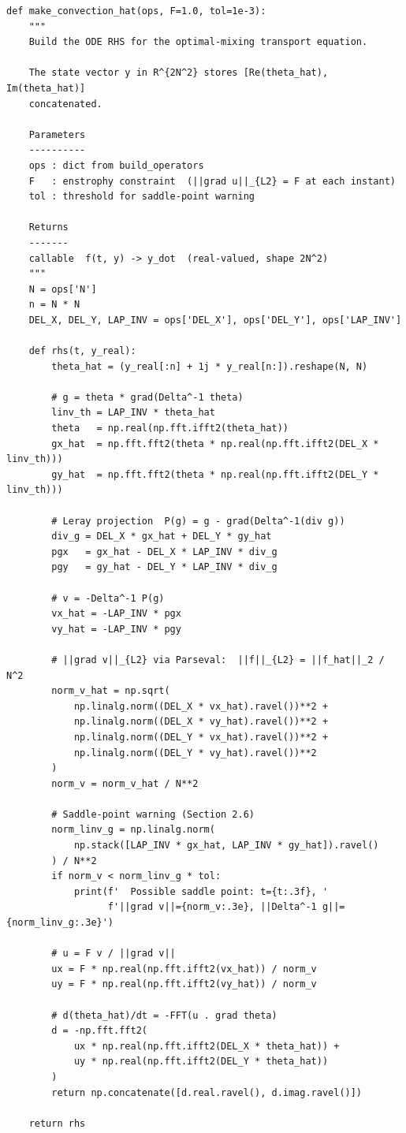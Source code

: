 \documentclass[12pt,a4paper]{article}
\theoremstyle{definition}
\theoremstyle{plain}
\begin{document}
\begin{lstlisting}
def make_convection_hat(ops, F=1.0, tol=1e-3):
    """
    Build the ODE RHS for the optimal-mixing transport equation.

    The state vector y in R^{2N^2} stores [Re(theta_hat), Im(theta_hat)]
    concatenated.

    Parameters
    ----------
    ops : dict from build_operators
    F   : enstrophy constraint  (||grad u||_{L2} = F at each instant)
    tol : threshold for saddle-point warning

    Returns
    -------
    callable  f(t, y) -> y_dot  (real-valued, shape 2N^2)
    """
    N = ops['N']
    n = N * N
    DEL_X, DEL_Y, LAP_INV = ops['DEL_X'], ops['DEL_Y'], ops['LAP_INV']

    def rhs(t, y_real):
        theta_hat = (y_real[:n] + 1j * y_real[n:]).reshape(N, N)

        # g = theta * grad(Delta^-1 theta)
        linv_th = LAP_INV * theta_hat
        theta   = np.real(np.fft.ifft2(theta_hat))
        gx_hat  = np.fft.fft2(theta * np.real(np.fft.ifft2(DEL_X * linv_th)))
        gy_hat  = np.fft.fft2(theta * np.real(np.fft.ifft2(DEL_Y * linv_th)))

        # Leray projection  P(g) = g - grad(Delta^-1(div g))
        div_g = DEL_X * gx_hat + DEL_Y * gy_hat
        pgx   = gx_hat - DEL_X * LAP_INV * div_g
        pgy   = gy_hat - DEL_Y * LAP_INV * div_g

        # v = -Delta^-1 P(g)
        vx_hat = -LAP_INV * pgx
        vy_hat = -LAP_INV * pgy

        # ||grad v||_{L2} via Parseval:  ||f||_{L2} = ||f_hat||_2 / N^2
        norm_v_hat = np.sqrt(
            np.linalg.norm((DEL_X * vx_hat).ravel())**2 +
            np.linalg.norm((DEL_X * vy_hat).ravel())**2 +
            np.linalg.norm((DEL_Y * vx_hat).ravel())**2 +
            np.linalg.norm((DEL_Y * vy_hat).ravel())**2
        )
        norm_v = norm_v_hat / N**2

        # Saddle-point warning (Section 2.6)
        norm_linv_g = np.linalg.norm(
            np.stack([LAP_INV * gx_hat, LAP_INV * gy_hat]).ravel()
        ) / N**2
        if norm_v < norm_linv_g * tol:
            print(f'  Possible saddle point: t={t:.3f}, '
                  f'||grad v||={norm_v:.3e}, ||Delta^-1 g||={norm_linv_g:.3e}')

        # u = F v / ||grad v||
        ux = F * np.real(np.fft.ifft2(vx_hat)) / norm_v
        uy = F * np.real(np.fft.ifft2(vy_hat)) / norm_v

        # d(theta_hat)/dt = -FFT(u . grad theta)
        d = -np.fft.fft2(
            ux * np.real(np.fft.ifft2(DEL_X * theta_hat)) +
            uy * np.real(np.fft.ifft2(DEL_Y * theta_hat))
        )
        return np.concatenate([d.real.ravel(), d.imag.ravel()])

    return rhs
\end{lstlisting}
\end{document}
